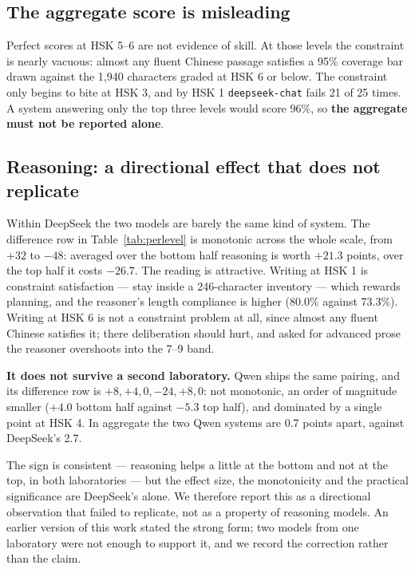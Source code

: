 \documentclass[11pt]{article}
\begin{document}
\subsection{The aggregate score is misleading}

Perfect scores at HSK 5--6 are not evidence of skill. At those levels the
constraint is nearly vacuous: almost any fluent Chinese passage satisfies a
95\% coverage bar drawn against the 1,940 characters graded at HSK 6 or below.
The constraint only
begins to bite at HSK 3, and by HSK 1 \texttt{deepseek-chat} fails 21 of 25
times. A system answering only the top three levels would score 96\%, so
\textbf{the aggregate must not be reported alone}.

\subsection{Reasoning: a directional effect that does not replicate}
\label{sec:reasoning}

Within DeepSeek the two models are barely the same kind of system. The
difference row in Table~\ref{tab:perlevel} is monotonic across the whole scale,
from $+32$ to $-48$: averaged over the bottom half reasoning is worth
$+21.3$ points, over the top half it costs $-26.7$. The reading is
attractive. Writing at HSK 1 is constraint satisfaction --- stay inside a
246-character inventory --- which rewards planning, and the reasoner's length
compliance is higher (80.0\% against 73.3\%). Writing at HSK 6 is not a
constraint problem at all, since almost any fluent Chinese satisfies it; there
deliberation should hurt, and asked for advanced prose the reasoner overshoots
into the 7--9 band.

\textbf{It does not survive a second laboratory.} Qwen ships the same pairing,
and its difference row is $+8, +4, 0, -24, +8, 0$: not monotonic, an order of
magnitude smaller ($+4.0$ bottom half against $-5.3$ top half), and dominated
by a single point at HSK 4. In aggregate the two Qwen systems are 0.7 points
apart, against DeepSeek's 2.7.

The sign is consistent --- reasoning helps a little at the bottom and not at
the top, in both laboratories --- but the effect size, the monotonicity and the
practical significance are DeepSeek's alone. We therefore report this as a
directional observation that failed to replicate, not as a property of
reasoning models. An earlier version of this work stated the strong form; two
models from one laboratory were not enough to support it, and we record the
correction rather than the claim.
\end{document}
